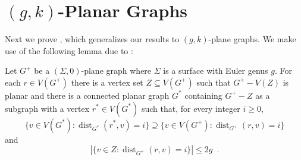 \documentclass{patmorin}
\DeclareMathOperator{\dist}{dist}
\begin{document}
\section{$(g,k)$-Planar Graphs}

Next we prove , which generalizes our results to $(g,k)$-plane graphs.  We make use of the following lemma due to \citet[Lemma~21]{dujmovic.joret.ea:planar}:


\begin{lem} 
Let $G^+$ be a $(\Sigma,0)$-plane graph where $\Sigma$ is a surface with Euler genus $g$. 
For each $r\in V(G^+)$ there is a vertex set $Z\subseteq V(G^+)$ such that $G^+-V(Z)$ is planar and there is a connected planar graph $G^*$ containing  $G^+-Z$ as a subgraph with a vertex $r^*\in V(G^*)$ such that, for every integer $i\ge 0$,
\[  \{v\in V(G^*): \dist_{G^*}(r^*,v) = i\} \supseteq \{v\in V(G^+): \dist_{G^+}(r,v) = i\} \]
and
\[ |\{v\in Z: \dist_{G^+}(r,v) = i\}| \le 2g \enspace . \]

\end{lem}
\end{document}
